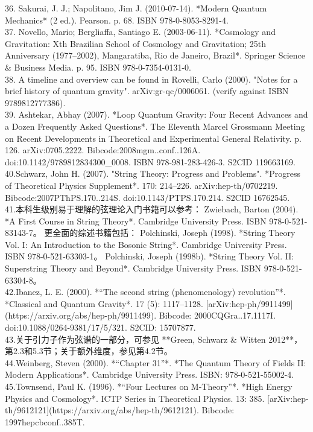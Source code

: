 36. Sakurai, J. J.; Napolitano, Jim J. (2010-07-14). *Modern Quantum Mechanics* (2 ed.). Pearson. p. 68. ISBN 978-0-8053-8291-4.\\
37. Novello, Mario; Bergliaffa, Santiago E. (2003-06-11). *Cosmology and Gravitation: Xth Brazilian School of Cosmology and Gravitation; 25th Anniversary (1977–2002), Mangaratiba, Rio de Janeiro, Brazil*. Springer Science & Business Media. p. 95. ISBN 978-0-7354-0131-0.\\
38. A timeline and overview can be found in Rovelli, Carlo (2000). "Notes for a brief history of quantum gravity". arXiv:gr-qc/0006061. (verify against ISBN 9789812777386).\\
39. Ashtekar, Abhay (2007). *Loop Quantum Gravity: Four Recent Advances and a Dozen Frequently Asked Questions*. The Eleventh Marcel Grossmann Meeting on Recent Developments in Theoretical and Experimental General Relativity. p. 126. arXiv:0705.2222. Bibcode:2008mgm..conf..126A. doi:10.1142/9789812834300_0008. ISBN 978-981-283-426-3. S2CID 119663169.\\
40.Schwarz, John H. (2007). "String Theory: Progress and Problems". *Progress of Theoretical Physics Supplement*. 170: 214–226. arXiv:hep-th/0702219. Bibcode:2007PThPS.170..214S. doi:10.1143/PTPS.170.214. S2CID 16762545.\\
41.本科生级别易于理解的弦理论入门书籍可以参考：  
Zwiebach, Barton (2004). *A First Course in String Theory*. Cambridge University Press. ISBN 978-0-521-83143-7。
更全面的综述书籍包括：  
Polchinski, Joseph (1998). *String Theory Vol. I: An Introduction to the Bosonic String*. Cambridge University Press. ISBN 978-0-521-63303-1。  
Polchinski, Joseph (1998b). *String Theory Vol. II: Superstring Theory and Beyond*. Cambridge University Press. ISBN 978-0-521-63304-8。\\
42.Ibanez, L. E. (2000). *“The second string (phenomenology) revolution”*. *Classical and Quantum Gravity*. 17 (5): 1117–1128. [arXiv:hep-ph/9911499](https://arxiv.org/abs/hep-ph/9911499). Bibcode: 2000CQGra..17.1117I. doi:10.1088/0264-9381/17/5/321. S2CID: 15707877.\\
43.关于引力子作为弦谱的一部分，可参见 **Green, Schwarz & Witten 2012**，第2.3和5.3节；关于额外维度，参见第4.2节。\\
44.Weinberg, Steven (2000). *“Chapter 31”*. *The Quantum Theory of Fields II: Modern Applications*. Cambridge University Press. ISBN: 978-0-521-55002-4.\\
45.Townsend, Paul K. (1996). *“Four Lectures on M-Theory”*. *High Energy Physics and Cosmology*. ICTP Series in Theoretical Physics. 13: 385. [arXiv:hep-th/9612121](https://arxiv.org/abs/hep-th/9612121). Bibcode: 1997hepcbconf..385T.\\
